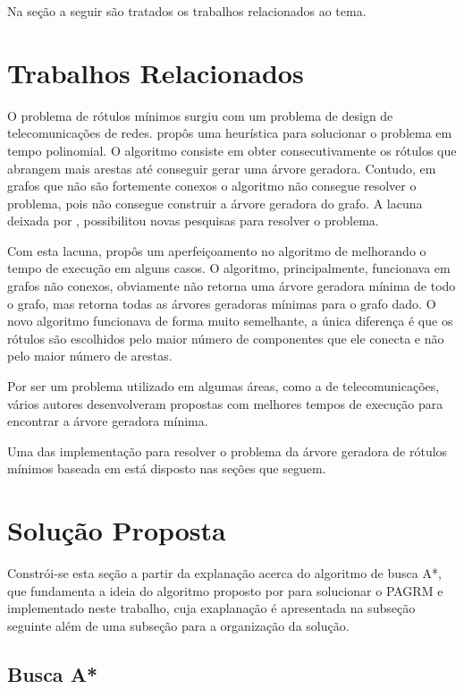 \documentclass[12pt]{article}
\begin{document}
	Na seção a seguir são tratados os trabalhos relacionados ao tema.

\section{Trabalhos Relacionados}\label{sec:trabalhosRelacionados}

	O problema de rótulos mínimos surgiu com um problema de design de telecomunicações de redes. \cite{chang:1996} propôs uma heurística para solucionar o problema em tempo polinomial. O algoritmo consiste em obter consecutivamente os rótulos que abrangem mais arestas até conseguir gerar uma árvore geradora. Contudo, em grafos que não são fortemente conexos o algoritmo não consegue resolver o problema, pois não consegue construir a árvore geradora do grafo. A lacuna deixada por \cite{chang:1996}, possibilitou novas pesquisas para resolver o problema.

	Com esta lacuna, \cite{krumke:1998} propôs um aperfeiçoamento no algoritmo de \cite{chang:1996} melhorando o tempo de execução em alguns casos. O algoritmo, principalmente, funcionava em grafos não conexos, obviamente não retorna uma árvore geradora mínima de todo o grafo, mas retorna todas as árvores geradoras mínimas para o grafo dado. O novo algoritmo funcionava de forma muito semelhante, a única diferença é que os rótulos são escolhidos pelo maior número de componentes que ele conecta e não pelo maior número de arestas.
	
	Por ser um problema utilizado em algumas áreas, como a de telecomunicações, vários autores desenvolveram propostas com melhores tempos de execução para encontrar a árvore geradora mínima.

	Uma das implementação para resolver o problema da árvore geradora de rótulos mínimos baseada em \cite{chang:1996} está disposto nas seções que seguem.

\section{Solução Proposta}\label{sec:solucao}

	Constrói-se esta seção a partir da explanação acerca do algoritmo de busca A*, que fundamenta a ideia do algoritmo proposto por \cite{chang:1996} para solucionar o PAGRM e implementado neste trabalho, cuja exaplanação é apresentada na subseção seguinte além de uma subseção para a organização da solução.

	\subsection{Busca A*}\label{sec:aestrela}
\end{document}
